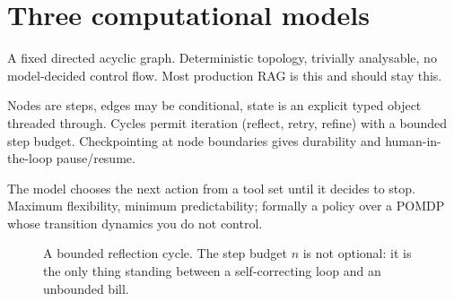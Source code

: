 \documentclass[11pt,twoside,openright]{book}
\theoremstyle{definition}
\theoremstyle{plain}
\theoremstyle{remark}
\begin{document}
\section{Three computational models}

\begin{description}[leftmargin=1.6em,style=nextline]
  \item[Chain (DAG).] A fixed directed acyclic graph. Deterministic topology,
        trivially analysable, no model-decided control flow. Most production
        RAG is this and should stay this.
  \item[State machine / graph with cycles.] Nodes are steps, edges may be
        conditional, state is an explicit typed object threaded through.
        Cycles permit iteration (reflect, retry, refine) with a bounded step
        budget. Checkpointing at node boundaries gives durability and
        human-in-the-loop pause/resume.
  \item[Autonomous agent loop.] The model chooses the next action from a tool
        set until it decides to stop. Maximum flexibility, minimum
        predictability; formally a policy over a POMDP whose transition
        dynamics you do not control.
\end{description}

\begin{figure}[H]
\centering
{}
\caption{A bounded reflection cycle. The step budget $n$ is not optional: it is
the only thing standing between a self-correcting loop and an unbounded bill.}
\label{fig:cycle}
\end{figure}
\end{document}
